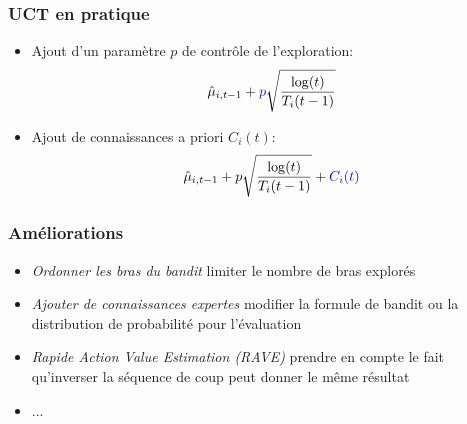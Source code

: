 \documentclass[compress, color = usenames, dvipsnames]{beamer}
\begin{document}
\begin{frame}
    \frametitle{UCT en pratique}
    \begin{itemize}
        \item Ajout d'un paramètre $p$ de contrôle de l'exploration:
            $$ \hat{\mu}_{i,t-1} + {\color{blue}p} \sqrt{\frac{\log(t)}{T_i(t-1)}} $$
        \item Ajout de connaissances a priori $C_i(t)$:
            $$ \hat{\mu}_{i,t-1} + p \sqrt{\frac{\log(t)}{T_i(t-1)}} + {\color{blue} C_i(t)} $$
    \end{itemize}
    
\end{frame}

\begin{frame}
    \frametitle{Améliorations}
    \begin{itemize}
        \item \textit{Ordonner les bras du bandit}
        \itemSo limiter le nombre de bras explorés
        \item \textit{Ajouter de connaissances expertes} \cite{chaslot2009adding}
        \itemSo modifier la formule de bandit ou la distribution de probabilité pour l'évaluation
        \item \textit{Rapide Action Value Estimation (RAVE)} \cite{gelly2007combining}
        \itemSo prendre en compte le fait qu'inverser la séquence de coup peut donner le même résultat
        \item ...
    \end{itemize}
    
\end{frame}
\end{document}
